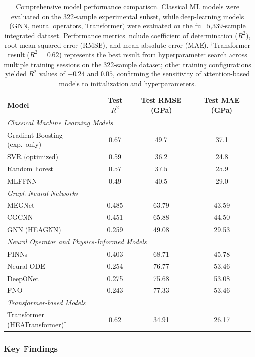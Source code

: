 \documentclass[11pt,a4paper]{article}
\begin{document}
\begin{table}[htbp]
\centering
\caption{Comprehensive model performance comparison. Classical ML models were evaluated on the 322-sample experimental subset, while deep-learning models (GNN, neural operators, Transformer) were evaluated on the full 5{,}339-sample integrated dataset. Performance metrics include coefficient of determination ($R^2$), root mean squared error (RMSE), and mean absolute error (MAE). $^\dagger$Transformer result ($R^2=0.62$) represents the best result from hyperparameter search across multiple training sessions on the 322-sample dataset; other training configurations yielded $R^2$ values of $-0.24$ and $0.05$, confirming the sensitivity of attention-based models to initialization and hyperparameters.}
\label{tab:comprehensive_results}
\begin{tabular}{lccc}
\hline
\textbf{Model} & \textbf{Test $R^2$} & \textbf{Test RMSE (GPa)} & \textbf{Test MAE (GPa)} \\
\hline
\multicolumn{4}{l}{\textit{Classical Machine Learning Models}} \\
\hline
Gradient Boosting (exp.\ only) & 0.67 & 49.7 & 37.1 \\
SVR (optimized) & 0.59 & 36.2 & 24.8 \\
Random Forest & 0.57 & 37.5 & 25.9 \\
MLFFNN & 0.49 & 40.5 & 29.0 \\
\hline
\multicolumn{4}{l}{\textit{Graph Neural Networks}} \\
\hline
MEGNet & 0.485 & 63.79 & 43.59 \\
CGCNN & 0.451 & 65.88 & 44.50 \\
GNN (HEAGNN) & 0.259 & 49.08 & 29.53 \\
\hline
\multicolumn{4}{l}{\textit{Neural Operator and Physics-Informed Models}} \\
\hline
PINNs & 0.403 & 68.71 & 45.78 \\
Neural ODE & 0.254 & 76.77 & 53.46 \\
DeepONet & 0.275 & 75.68 & 53.08 \\
FNO & 0.243 & 77.33 & 53.46 \\
\hline
\multicolumn{4}{l}{\textit{Transformer-based Models}} \\
\hline
Transformer (HEATransformer)$^\dagger$ & 0.62 & 34.91 & 26.17 \\
\hline
\end{tabular}
\end{table}

\subsubsection{Key Findings}
\end{document}
